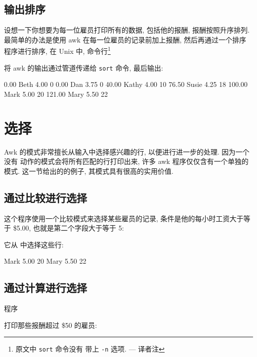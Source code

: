 \subsection{输出排序}
\label{subsec:sorting_the_output}

设想一下你想要为每一位雇员打印所有的数据, 包括他的报酬, 报酬按照升序排列.
最简单的办法是使用 awk 在每一位雇员的记录前加上报酬, 然后再通过一个排序
程序进行排序, 在 Unix 中, 命令行\footnote{原文中 \texttt{sort} 命令没有
带上 \texttt{-n} 选项. --- 译者注}
将 awk 的输出通过管道传递给 \texttt{sort} 命令, 最后输出:
\begin{myverb}
      0.00 Beth    4.00    0
      0.00 Dan     3.75    0
     40.00 Kathy   4.00    10
     76.50 Susie   4.25    18
    100.00 Mark    5.00    20
    121.00 Mary    5.50    22
\end{myverb}

\section{选择}
\label{sec:selection}

Awk 的模式非常擅长从输入中选择感兴趣的行, 以便进行进一步的处理. 因为一个没有
动作的模式会将所有匹配的行打印出来, 许多 awk 程序仅仅含有一个单独的模式.
这一节给出的的例子, 其模式具有很高的实用价值.

\subsection{通过比较进行选择}
\label{subsec:selection_by_comparison}

这个程序使用一个比较模式来选择某些雇员的记录, 条件是他的每小时工资大于等于
\$5.00, 也就是第二个字段大于等于 5:
它从  中选择这些行:
\begin{myverb}
    Mark    5.00    20
    Mary    5.50    22
\end{myverb}

\subsection{通过计算进行选择}
\label{subsec:selection_by_computation}

程序
打印那些报酬超过 \$50 的雇员:

